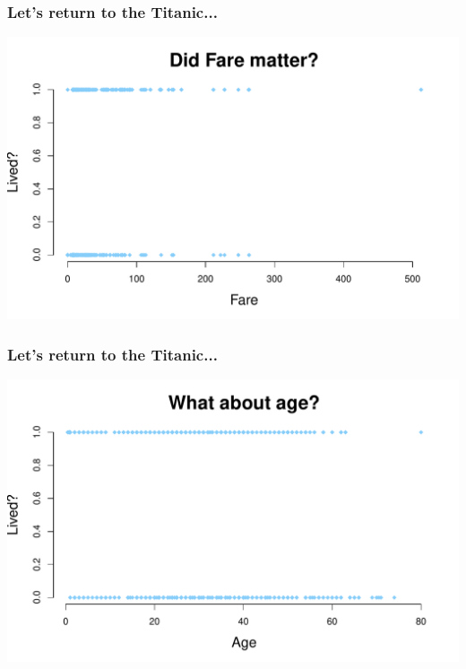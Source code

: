 \documentclass[aspectratio=169]{beamer}
\begin{document}
\begin{frame}
\frametitle{Let's return to the Titanic...}

\begin{center}
\includegraphics[scale=0.55]{titanic_fare.pdf}
\end{center}

\end{frame}

\begin{frame}
\frametitle{Let's return to the Titanic...}

\begin{center}
\includegraphics[scale=0.55]{titanic_age.pdf}
\end{center}

\end{frame}
\end{document}
